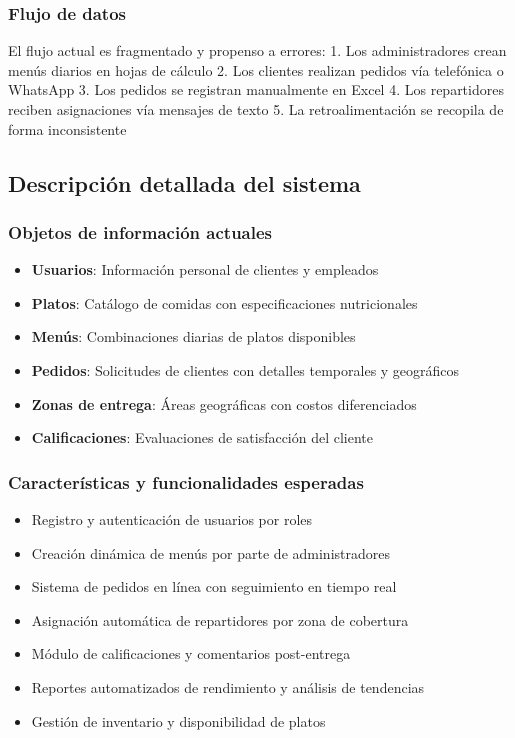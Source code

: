 \documentclass[12pt,a4paper]{article}
\begin{document}
\subsubsection{Flujo de datos}
El flujo actual es fragmentado y propenso a errores:
1. Los administradores crean menús diarios en hojas de cálculo
2. Los clientes realizan pedidos vía telefónica o WhatsApp
3. Los pedidos se registran manualmente en Excel
4. Los repartidores reciben asignaciones vía mensajes de texto
5. La retroalimentación se recopila de forma inconsistente

\subsection{Descripción detallada del sistema}
\subsubsection{Objetos de información actuales}
\begin{itemize}
    \item \textbf{Usuarios}: Información personal de clientes y empleados
    \item \textbf{Platos}: Catálogo de comidas con especificaciones nutricionales
    \item \textbf{Menús}: Combinaciones diarias de platos disponibles
    \item \textbf{Pedidos}: Solicitudes de clientes con detalles temporales y geográficos
    \item \textbf{Zonas de entrega}: Áreas geográficas con costos diferenciados
    \item \textbf{Calificaciones}: Evaluaciones de satisfacción del cliente
\end{itemize}

\subsubsection{Características y funcionalidades esperadas}
\begin{itemize}
    \item Registro y autenticación de usuarios por roles
    \item Creación dinámica de menús por parte de administradores
    \item Sistema de pedidos en línea con seguimiento en tiempo real
    \item Asignación automática de repartidores por zona de cobertura
    \item Módulo de calificaciones y comentarios post-entrega
    \item Reportes automatizados de rendimiento y análisis de tendencias
    \item Gestión de inventario y disponibilidad de platos
\end{itemize}
\end{document}
